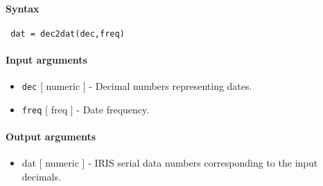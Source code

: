 


	\paragraph{Syntax}
 
 \begin{verbatim}
 dat = dec2dat(dec,freq)
 \end{verbatim}
 
 \paragraph{Input arguments}
 
 \begin{itemize}
 \item
   \texttt{dec} {[} numeric {]} - Decimal numbers representing dates.
 \item
   \texttt{freq} {[} freq {]} - Date frequency.
 \end{itemize}
 
 \paragraph{Output arguments}
 
 \begin{itemize}
 \item
   dat {[} numeric {]} - IRIS serial data numbers corresponding to the
   input decimals.
 \end{itemize}



